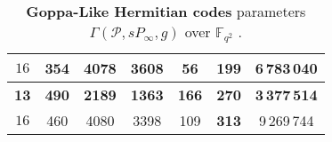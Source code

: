 \documentclass[
10pt, %
%
aspectratio=169, %
]{beamer}
\theoremstyle{plain}%
\theoremstyle{definition}
\theoremstyle{remark}
\newcommand{\calP}{\mathcal{P}}
\newcommand{\F}{\mathbb{F}}
\begin{document}
\begin{frame}
\begin{table}[h]
\begin{center}
{\begin{tabular}{|c|c|c|c|c|c|c|}
				\hline 
				${16}$&354& 4078& 3608& 56& \cellcolor{applegreen}\textbf{199}& 6\,783\,040   \\
				
				\hline \hline
				\rowcolor{applegreen}\textbf{13}& \textbf{490}& \textbf{2189}& \textbf{1363}& \textbf{166}& \textbf{270}& \textbf{3\,377\,514} \\
				
				\hline 
				${16}$& 460 &4080& 3398& 109& \cellcolor{applegreen}\textbf{313}& 9\,269\,744\\
				\hline
			\end{tabular}}
			\caption{\textbf{Goppa-Like Hermitian codes }parameters $\Gamma(\calP,sP_\infty,g)$ over $\F_{q^2}$ \cite{lhotel2023goppa}.} \label{table:goppa-herm}
		\end{center}
	\end{table}
\vspace*{-0.8em}
\end{frame}
\end{document}
